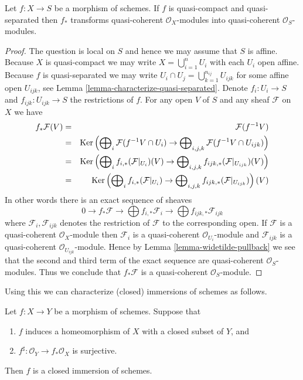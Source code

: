 \begin{lemma}
\label{lemma-push-forward-quasi-coherent}
Let $f : X \to S$ be a morphism of schemes.
If $f$ is quasi-compact and quasi-separated then
$f_*$ transforms quasi-coherent $\mathcal{O}_X$-modules
into quasi-coherent $\mathcal{O}_S$-modules.
\end{lemma}

\begin{proof}
The question is local on $S$ and hence we may assume that
$S$ is affine. Because $X$ is quasi-compact we may write
$X = \bigcup_{i = 1}^n U_i$ with each $U_i$ open affine.
Because $f$ is quasi-separated we may write
$U_i \cap U_j = \bigcup_{k = 1}^{n_{ij}} U_{ijk}$ for some
affine open $U_{ijk}$, see Lemma \ref{lemma-characterize-quasi-separated}.
Denote $f_i : U_i \to S$ and $f_{ijk} : U_{ijk} \to S$ the
restrictions of $f$. For any open $V$ of $S$ and any sheaf
$\mathcal{F}$ on $X$ we have
\begin{eqnarray*}
f_*\mathcal{F}(V) & = & \mathcal{F}(f^{-1}V) \\
& = &
\mathop{\mathrm{Ker}}\left(
\bigoplus\nolimits_i \mathcal{F}(f^{-1}V \cap U_i)
\to
\bigoplus\nolimits_{i, j, k} \mathcal{F}(f^{-1}V \cap U_{ijk})\right) \\
& = &
\mathop{\mathrm{Ker}}\left(
\bigoplus\nolimits_i f_{i, *}(\mathcal{F}|_{U_i})(V)
\to
\bigoplus\nolimits_{i, j, k} f_{ijk, *}(\mathcal{F}|_{U_{ijk}})(V)\right) \\
& = &
\mathop{\mathrm{Ker}}\left(
\bigoplus\nolimits_i f_{i, *}(\mathcal{F}|_{U_i})
\to
\bigoplus\nolimits_{i, j, k} f_{ijk, *}(\mathcal{F}|_{U_{ijk}})\right)(V)
\end{eqnarray*}
In other words there is an exact sequence of sheaves
$$
0 \to f_*\mathcal{F}
\to \bigoplus f_{i, *}\mathcal{F}_i
\to \bigoplus f_{ijk, *}\mathcal{F}_{ijk}
$$
where $\mathcal{F}_i, \mathcal{F}_{ijk}$ denotes the
restriction of $\mathcal{F}$ to the corresponding open.
If $\mathcal{F}$ is a quasi-coherent $\mathcal{O}_X$-module
then $\mathcal{F}_i$ is a quasi-coherent $\mathcal{O}_{U_i}$-module
and $\mathcal{F}_{ijk}$ is a quasi-coherent $\mathcal{O}_{U_{ijk}}$-module.
Hence by Lemma \ref{lemma-widetilde-pullback} we see that the second and
third term of the exact sequence are quasi-coherent
$\mathcal{O}_S$-modules. Thus we conclude that
$f_*\mathcal{F}$ is a quasi-coherent $\mathcal{O}_S$-module.
\end{proof}

\noindent
Using this we can characterize (closed) immersions of schemes
as follows.

\begin{lemma}
\label{lemma-characterize-closed-immersions}
Let $f : X \to Y$ be a morphism of schemes.
Suppose that
\begin{enumerate}
\item $f$ induces a homeomorphism of $X$ with a
closed subset of $Y$, and
\item $f^\sharp : \mathcal{O}_Y \to f_*\mathcal{O}_X$
is surjective.
\end{enumerate}
Then $f$ is a closed immersion of schemes.
\end{lemma}

